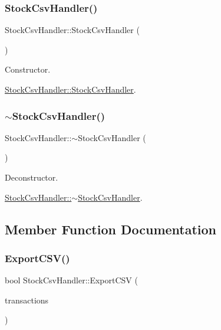 \subsubsection{\texorpdfstring{Stock\+Csv\+Handler()}{StockCsvHandler()}}
{\footnotesize\ttfamily Stock\+Csv\+Handler\+::\+Stock\+Csv\+Handler (\begin{DoxyParamCaption}{ }\end{DoxyParamCaption})}



Constructor. 

\mbox{\hyperlink{class_stock_csv_handler_a79a39d762f4dd87f82ee927c33f596cc}{Stock\+Csv\+Handler\+::\+Stock\+Csv\+Handler}}. \mbox{\label{class_stock_csv_handler_a9c197759533cc003c511d784a1cdb521}} 
\subsubsection{\texorpdfstring{$\sim$\+Stock\+Csv\+Handler()}{~StockCsvHandler()}}
{\footnotesize\ttfamily Stock\+Csv\+Handler\+::$\sim$\+Stock\+Csv\+Handler (\begin{DoxyParamCaption}{ }\end{DoxyParamCaption})}



Deconstructor. 

\mbox{\hyperlink{class_stock_csv_handler_a9c197759533cc003c511d784a1cdb521}{Stock\+Csv\+Handler\+::$\sim$\+Stock\+Csv\+Handler}}. 

\subsection{Member Function Documentation}
\mbox{\label{class_stock_csv_handler_a5302fb4580cc69a73aa22a6e97e314ad}} 
\subsubsection{\texorpdfstring{Export\+C\+S\+V()}{ExportCSV()}}
{\footnotesize\ttfamily bool Stock\+Csv\+Handler\+::\+Export\+C\+SV (\begin{DoxyParamCaption}\item[{std\+::vector$<$ \mbox{\hyperlink{class_transaction_type}{Transaction\+Type}} $>$}]{transactions }\end{DoxyParamCaption})}



